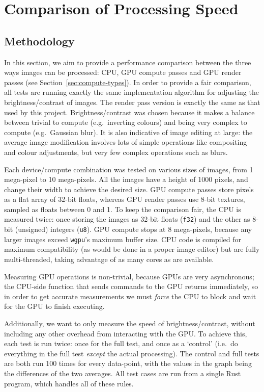 \documentclass[12pt]{article}
\begin{document}
\pagebreak

\section{Comparison of Processing Speed}

\subsection{Methodology}

In this section, we aim to provide a performance comparison between the three ways images can be
processed: CPU, GPU compute passes and GPU render passes (see Section~\ref{sec:compute-types}).  In
order to provide a fair comparison, all tests are running exactly the same implementation algorithm
for adjusting the brightness/contrast of images.  The render pass version is exactly the same as
that used by this project.  Brightness/contrast was chosen because it makes a balance between
trivial to compute (e.g.\ inverting colours) and being very complex to compute (e.g.\ Gaussian
blur).  It is also indicative of image editing at large: the average image modification involves
lots of simple operations like compositing and colour adjustments, but very few complex operations
such as blurs.

Each device/compute combination was tested on various sizes of images, from 1 mega-pixel to 10
mega-pixels.  All the images have a height of 1000 pixels, and change their width to achieve the
desired size.  GPU compute passes store pixels as a flat array of 32-bit floats, whereas GPU render
passes use 8-bit textures, sampled as floats between 0 and 1.  To keep the comparison fair, the CPU
is measured twice: once storing the images as 32-bit floats (\verb|f32|) and the other as 8-bit
(unsigned) integers (\verb|u8|).  GPU compute stops at 8 mega-pixels, because any larger images
exceed \verb|wgpu|'s maximum buffer size.  CPU code is compiled for maximum compatibility (as would
be done in a proper image editor) but are fully multi-threaded, taking advantage of as many cores as
are available.

Measuring GPU operations is non-trivial, because GPUs are very asynchronous; the CPU-side function
that sends commands to the GPU returns immediately, so in order to get accurate measurements we must
\emph{force} the CPU to block and wait for the GPU to finish executing.

Additionally, we want to only measure the speed of brightness/contrast, without including any other
overhead from interacting with the GPU.  To achieve this, each test is run twice: once for the full
test, and once as a `control' (i.e.\ do everything in the full test \emph{except} the actual
processing).  The control and full tests are both run 100 times for every data-point, with the
values in the graph being the differences of the two averages.  All test cases are run from a single
Rust program, which handles all of these rules.
\end{document}
